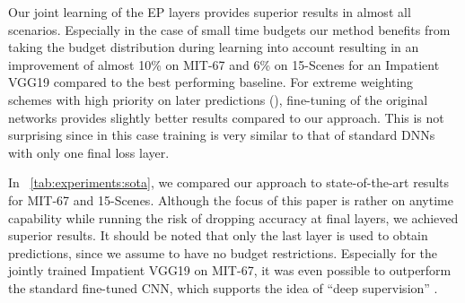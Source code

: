 \documentclass{bmvc2k}
\begin{document}
    Our joint learning of the EP layers provides superior results in almost all scenarios.
    Especially in the case of small time budgets our method benefits from taking the budget distribution during learning into account 
    resulting in an improvement of almost 10\% on MIT-67 and 6\% on 15-Scenes for an Impatient VGG19 compared to the best performing baseline.
    For extreme weighting schemes with high priority on later predictions (), fine-tuning of the original networks provides slightly better results compared to our approach.
    This is not surprising since in this case training is very similar to that of standard DNNs with only one final loss layer.
    
    In \tablename~\ref{tab:experiments:sota}, we compared our approach to state-of-the-art results for MIT-67 and 15-Scenes.
    Although the focus of this paper is rather on anytime capability while running the risk of dropping accuracy at final layers, we achieved superior results.
    It should be noted that only the last layer is used to obtain predictions, since we assume to have no budget restrictions.
    Especially for the jointly trained Impatient VGG19 on MIT-67, it was even possible to outperform the standard fine-tuned CNN, which supports the idea of ``deep supervision'' \cite{wang2015training}.
    
%
%
%
%
%
%
%
%
%
%
%
%
%
%
%
%
%
%
%
%
%
%
%
%
%
%
%
%
%
%
%
%
%
%
%
%
%
%
%
%
%
%
%
%
%
%
%
%
%
%
%
    
\end{document}
